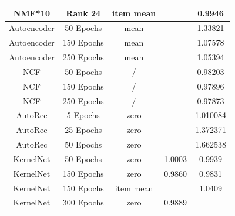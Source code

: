 \documentclass[10pt,conference,compsocconf]{IEEEtran}
\begin{document}
\begin{table}
{\begin{tabular}{|| c | c | c | c | c ||}
                NMF*10            & Rank 24                & item mean               &                        & 0.9946                  \\
                \hline
                Autoencoder       & 50 Epochs                         & mean                    &                        & 1.33821                 \\
                Autoencoder       & 150 Epochs                        & mean                    &                        & 1.07578                 \\
                Autoencoder       & 250 Epochs                        & mean                    &                        & 1.05394                 \\
                \hline
                NCF               & 50 Epochs                         & /                       &                        & 0.98203                 \\
                NCF               & 150 Epochs                        & /                       &                        & 0.97896                 \\
                NCF               & 250 Epochs                        & /                       &                        & 0.97873                 \\
                \hline
                AutoRec           & 5 Epochs                          & zero                    &                        & 1.010084                \\
                AutoRec           & 25 Epochs                         & zero                    &                        & 1.372371                \\
                AutoRec           & 50 Epochs                         & zero                    &                        & 1.662538                \\
                \hline
                KernelNet         & 50 Epochs                         & zero                    & 1.0003                 & 0.9939                  \\
                KernelNet         & 150 Epochs                        & zero                    & 0.9860                 & 0.9831                  \\
                KernelNet         & 150 Epochs                        & item mean               &                        & 1.0409                  \\
                KernelNet         & 300 Epochs                        & zero                    & 0.9889                 &                         \\

\end{tabular}}
\end{table}
\end{document}
